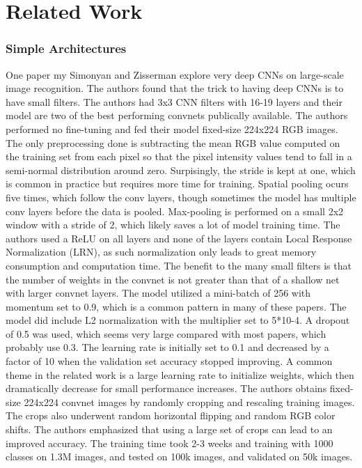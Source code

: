 \section{Related Work}

\subsubsection{Simple Architectures}
One paper my Simonyan and Zisserman explore very deep CNNs on large-scale image recognition.  The authors found that the trick to having deep CNNs is to have small filters.  The authors had 3x3 CNN filters with 16-19 layers and their model are two of the best performing convnets publically available.  The authors performed no fine-tuning and fed their model fixed-size 224x224 RGB images.  The only preprocessing done is subtracting the mean RGB value computed on the training set from each pixel so that the pixel intensity values tend to fall in a semi-normal distribution around zero.  Surpisingly, the stride is kept at one, which is common in practice but requires more time for training.  Spatial pooling ocurs five times, which follow the conv layers, though sometimes the model has multiple conv layers before the data is pooled.  Max-pooling is performed on a small 2x2 window with a stride of 2, which likely saves a lot of model training time.  The authors used a ReLU on all layers and none of the layers contain Local Response Normalization (LRN), as such normalization only leads to great memory consumption and computation time.  The benefit to the many small filters is that the number of weights in the convnet is not greater than that of a shallow net with larger convnet layers.  The model utilized a mini-batch of 256 with momentum set to 0.9, which is a common pattern in many of these papers.  The model did include L2 normalization with the multiplier set to 5*10-4.  A dropout of 0.5 was used, which seems very large compared with most papers, which probably use 0.3.  The learning rate is initially set to 0.1 and decreased by a factor of 10 when the validation set accuracy stopped improving.  A common theme in the related work is a large learning rate to initialize weights, which then dramatically decrease for small performance increases.  The authors obtains fixed-size 224x224 convnet images by randomly cropping and rescaling training images.  The crops also underwent random horizontal flipping and random RGB color shifts.  The authors emphasized that using a large set of crops can lead to an improved accuracy.  The training time took 2-3 weeks and training with 1000 classes on 1.3M images, and tested on 100k images, and validated on 50k images.  

